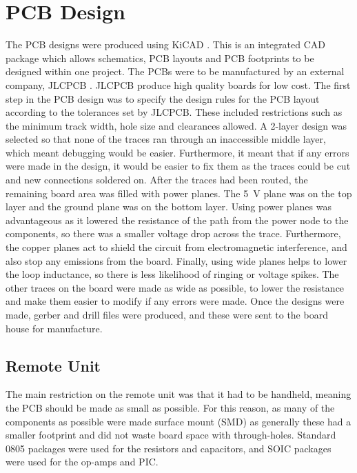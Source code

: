 \section{PCB Design}
The PCB designs were produced using KiCAD \cite{kicad}. This is an integrated CAD package which allows schematics, PCB layouts and PCB footprints to be designed within one project. The PCBs were to be manufactured by an external company, JLCPCB \cite{pcb_house}. JLCPCB produce high quality boards for low cost. The first step in the PCB design was to specify the design rules for the PCB layout according to the tolerances set by JLCPCB. These included restrictions such as the minimum track width, hole size and clearances allowed. A 2-layer design was selected so that none of the traces ran through an inaccessible middle layer, which meant debugging would be easier. Furthermore, it meant that if any errors were made in the design, it would be easier to fix them as the traces could be cut and new connections soldered on. After the traces had been routed, the remaining board area was filled with power planes. The \SI{+5}{\volt} plane was on the top layer and the ground plane was on the bottom layer. Using power planes was advantageous as it lowered the resistance of the path from the power node to the components, so there was a smaller voltage drop across the trace. Furthermore, the copper planes act to shield the circuit from electromagnetic interference, and also stop any emissions from the board. Finally, using wide planes helps to lower the loop inductance, so there is less likelihood of ringing or voltage spikes. The other traces on the board were made as wide as possible, to lower the resistance and make them easier to modify if any errors were made. Once the designs were made, gerber and drill files were produced, and these were sent to the board house for manufacture.\\


\subsection{Remote Unit}
The main restriction on the remote unit was that it had to be handheld, meaning the PCB should be made as small as possible. For this reason, as many of the components as possible were made surface mount (SMD) as generally these had a smaller footprint and did not waste board space with through-holes. Standard 0805 packages were used for the resistors and capacitors, and SOIC packages were used for the op-amps and PIC.\\

